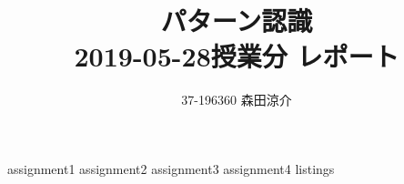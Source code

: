 \documentclass[dvipdfmx, fleqn]{jsarticle}
\title{
    パターン認識 \\
    2019-05-28授業分 レポート
    }
\author{37-196360 \quad 森田涼介}
\begin{document}
\maketitle
{assignment1}
\clearpage
{assignment2}
\clearpage
{assignment3}
\clearpage
{assignment4}
\clearpage
{listings}
\end{document}
